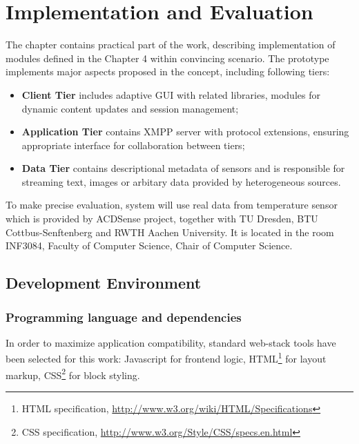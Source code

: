 \chapter{Implementation and Evaluation}
	The chapter contains practical part of the work, describing implementation of modules defined in the Chapter 4 within convincing scenario. The prototype implements major aspects proposed in the concept, including following tiers:
	 \begin{itemize}
		\item \textbf{Client Tier} includes adaptive GUI with related libraries, modules for dynamic content updates and session management;
		\item \textbf{Application Tier} contains XMPP server with protocol extensions, ensuring appropriate interface for collaboration between tiers;
		\item \textbf{Data Tier} contains descriptional metadata of sensors and is responsible for streaming text, images or arbitary data provided by heterogeneous sources.
	\end{itemize}
	To make precise evaluation, system will use real data from temperature sensor which is provided by ACDSense project, together with TU Dresden, BTU Cottbus-Senftenberg and RWTH Aachen University. It is located in the room INF3084, Faculty of Computer Science, Chair of Computer Science.


\section{Development Environment}
 \subsection{Programming language and dependencies}
	In order to maximize application compatibility, standard web-stack tools have been selected for this work: Javascript for frontend logic, HTML\footnote{HTML specification, \url{http://www.w3.org/wiki/HTML/Specifications}} for layout markup, CSS\footnote{CSS specification, \url{http://www.w3.org/Style/CSS/specs.en.html}} for block styling.

